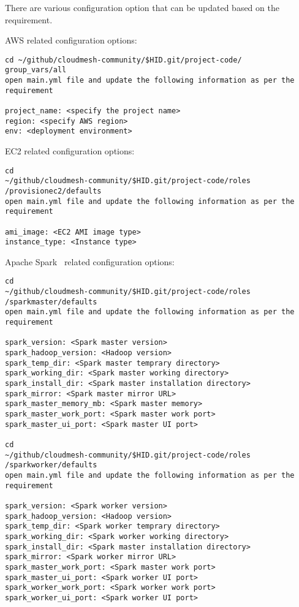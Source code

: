There are various configuration option that can be updated based on
the requirement.

AWS related configuration options:

\begin{verbatim}
cd ~/github/cloudmesh-community/$HID.git/project-code/
group_vars/all
open main.yml file and update the following information as per the
requirement

project_name: <specify the project name>
region: <specify AWS region>
env: <deployment environment>
\end{verbatim}

EC2 related configuration options:

\begin{verbatim}
cd
~/github/cloudmesh-community/$HID.git/project-code/roles
/provisionec2/defaults
open main.yml file and update the following information as per the
requirement
 
ami_image: <EC2 AMI image type>
instance_type: <Instance type>
\end{verbatim}


Apache Spark~\cite{hid-sp18-511-www-spark} related configuration options:

\begin{verbatim}
cd
~/github/cloudmesh-community/$HID.git/project-code/roles
/sparkmaster/defaults
open main.yml file and update the following information as per the
requirement

spark_version: <Spark master version>
spark_hadoop_version: <Hadoop version>
spark_temp_dir: <Spark master temprary directory>
spark_working_dir: <Spark master working directory>
spark_install_dir: <Spark master installation directory>
spark_mirror: <Spark master mirror URL>
spark_master_memory_mb: <Spark master memory>
spark_master_work_port: <Spark master work port>
spark_master_ui_port: <Spark master UI port>

cd
~/github/cloudmesh-community/$HID.git/project-code/roles
/sparkworker/defaults
open main.yml file and update the following information as per the
requirement

spark_version: <Spark worker version>
spark_hadoop_version: <Hadoop version>
spark_temp_dir: <Spark worker temprary directory>
spark_working_dir: <Spark worker working directory>
spark_install_dir: <Spark master installation directory>
spark_mirror: <Spark worker mirror URL>
spark_master_work_port: <Spark master work port>
spark_master_ui_port: <Spark worker UI port>
spark_worker_work_port: <Spark worker work port>
spark_worker_ui_port: <Spark worker UI port>
\end{verbatim}

